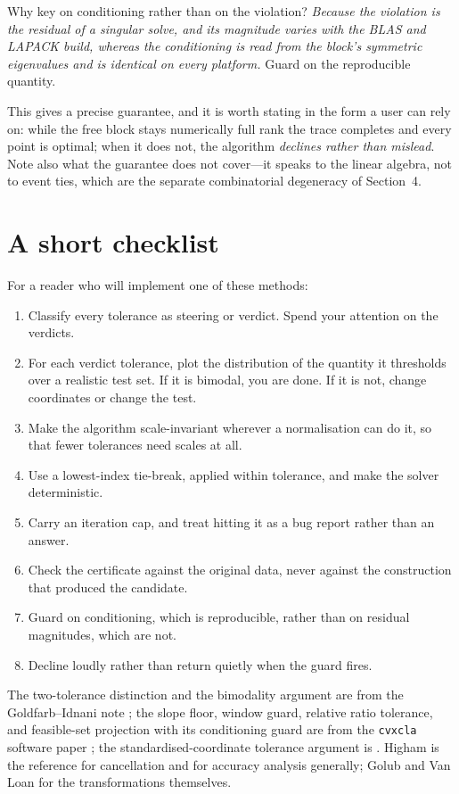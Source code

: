Why key on conditioning rather than on the violation? \emph{Because the violation is the
residual of a singular solve, and its magnitude varies with the BLAS and LAPACK build,
whereas the conditioning is read from the block's symmetric eigenvalues and is identical
on every platform.} Guard on the reproducible quantity.

This gives a precise guarantee, and it is worth stating in the form a user can rely on:
while the free block stays numerically full rank the trace completes and every point is
optimal; when it does not, the algorithm \emph{declines rather than mislead}. Note also
what the guarantee does not cover---it speaks to the linear algebra, not to event ties,
which are the separate combinatorial degeneracy of Section~4.

\section{A short checklist}

For a reader who will implement one of these methods:

\begin{enumerate}
\item Classify every tolerance as steering or verdict. Spend your attention on the
      verdicts.
\item For each verdict tolerance, plot the distribution of the quantity it thresholds
      over a realistic test set. If it is bimodal, you are done. If it is not, change
      coordinates or change the test.
\item Make the algorithm scale-invariant wherever a normalisation can do it, so that
      fewer tolerances need scales at all.
\item Use a lowest-index tie-break, applied within tolerance, and make the solver
      deterministic.
\item Carry an iteration cap, and treat hitting it as a bug report rather than an
      answer.
\item Check the certificate against the original data, never against the construction
      that produced the candidate.
\item Guard on conditioning, which is reproducible, rather than on residual magnitudes,
      which are not.
\item Decline loudly rather than return quietly when the guard fires.
\end{enumerate}

\begin{notes}
The two-tolerance distinction and the bimodality argument are from the Goldfarb--Idnani note \cite{schmelzer2026quadprog};
the slope floor, window guard, relative ratio tolerance, and feasible-set projection
with its conditioning guard are from the \texttt{cvxcla} software paper \cite{cvxcla};
the standardised-coordinate tolerance argument is \cite{schmelzer2026rmt}. Higham
\cite{higham2002} is the reference for cancellation and for accuracy analysis
generally; Golub and Van Loan \cite{golub2013} for the transformations themselves.
\end{notes}

